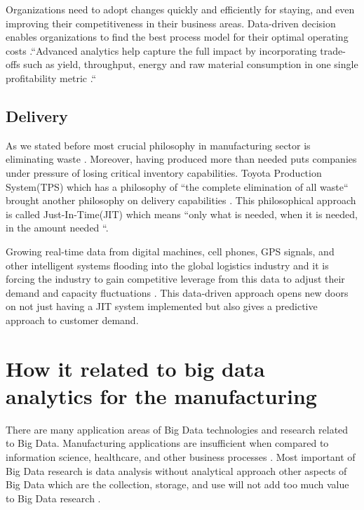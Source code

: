 \documentclass[sigconf]{acmart}
\begin{document}
Organizations need to adopt changes quickly and efficiently for staying, and even improving their competitiveness in their business areas\cite{HAMMER2017715}. Data-driven decision enables organizations to find the best process model for their optimal operating costs \cite{HAMMER2017715}.``Advanced analytics help capture the full impact by incorporating trade-offs such as yield, throughput, energy and raw material consumption in one single profitability metric \cite{HAMMER2017715}.``

\subsection{Delivery}
As we stated before most crucial philosophy in manufacturing sector is eliminating waste \cite{www-toyota}. Moreover, having produced more than needed puts companies under pressure of losing critical inventory capabilities. Toyota Production System(TPS) which has a philosophy of ``the complete elimination of all waste`` brought another philosophy on delivery capabilities \cite{www-toyota}. This philosophical approach is called Just-In-Time(JIT) which means ``only what is needed, when it is needed, in the amount needed \cite{www-toyota}``.

Growing real-time data from digital machines, cell phones, GPS signals, and other intelligent systems flooding into the global logistics industry and it is forcing the industry to gain competitive leverage from this data to adjust their demand and capacity fluctuations \cite{ZHONG2016572}. This data-driven approach opens new doors on not just having a JIT system implemented but also gives a predictive approach to customer demand. 


\section{How it related to big data analytics for the manufacturing}

There are many application areas of Big Data technologies and research related to Big Data\cite{BABICEANU2016128}. Manufacturing applications are insufficient when compared to information science, healthcare, and other business processes \cite{BABICEANU2016128}. Most important of Big Data research is data analysis without analytical approach other aspects of Big Data which are the collection, storage, and use will not add too much value to Big Data research \cite{BABICEANU2016128}. 
\end{document}
